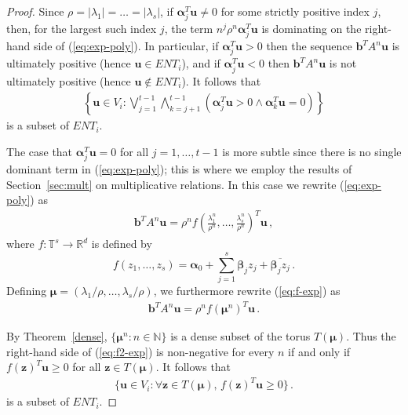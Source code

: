 \begin{proof}
Since $\rho=|\lambda_1|=\ldots=|\lambda_s|$, if
$\boldsymbol{\alpha}_j^T\boldsymbol{u}\neq 0$ for some strictly
positive index $j$, then, for the largest such index $j$, the term
$n^{j}\rho^n\boldsymbol{\alpha}_{j}^T\boldsymbol{u}$ is
dominating on the right-hand side of (\ref{eq:exp-poly}).  In
particular, if $\boldsymbol{\alpha}_{j}^T\boldsymbol{u}>0$ then the
sequence $\boldsymbol{b}^TA^n\boldsymbol{u}$ is ultimately positive
(hence $\boldsymbol{u}\in \mathit{ENT}_i$), and if
$\boldsymbol{\alpha}_{j}^T\boldsymbol{u}<0$ then
$\boldsymbol{b}^TA^n\boldsymbol{u}$ is not ultimately positive (hence
$\boldsymbol{u}\not\in\mathit{ENT}_i$).  It follows that
\begin{gather}
\left\{ \boldsymbol{u} \in V_i : \bigvee_{j=1}^{t-1}\bigwedge_{k=j+1}^{t-1}
(\boldsymbol{\alpha}_j^T \boldsymbol{u}>0 \wedge
\boldsymbol{\alpha}_k^T \boldsymbol{u}=0) \right\}
\label{eq:ENT1}
\end{gather}
is a subset of $\mathit{ENT}_i$.

The case that $\boldsymbol{\alpha}_j^T\boldsymbol{u}=0$ for all
$j=1,\ldots,t-1$ is more subtle since there is no single dominant term
in (\ref{eq:exp-poly}); this is where we employ the results of
Section~\ref{sec:mult} on multiplicative relations. In this case we
rewrite (\ref{eq:exp-poly}) as
\begin{gather}
\boldsymbol{b}^T A^n \boldsymbol{u} =
 \rho^n f\left(\frac{\lambda^n_1}{\rho^n},\ldots,
               \frac{\lambda^n_s}{\rho^n}\right)^T \boldsymbol{u} \, ,
\label{eq:f-exp}
\end{gather}
where $f:\mathbb{T}^s\rightarrow\mathbb{R}^d$ is defined by
\[f(z_1,\ldots,z_s)=\boldsymbol{\alpha}_0 + \sum_{j=1}^s \boldsymbol{\beta}_jz_j + \overline{\boldsymbol{\beta}_jz_j} \, .\]
Defining $\boldsymbol\mu=(\lambda_1/\rho,\ldots,\lambda_s/\rho)$, we furthermore rewrite (\ref{eq:f-exp}) as
\begin{gather}
\boldsymbol{b}^T A^n \boldsymbol{u} =
    \rho^n f(\boldsymbol\mu^n)^T \boldsymbol{u} \, .
\label{eq:f2-exp}
\end{gather}

By Theorem~\ref{dense}, $\{ \boldsymbol\mu^n : n \in
\mathbb{N} \}$ is a dense subset of the torus $T(\boldsymbol{\mu})$.
Thus the right-hand side of (\ref{eq:f2-exp}) is non-negative for
every $n$ if and only if $f(\boldsymbol{z})^T\boldsymbol{u}\geq 0$ for
all $\boldsymbol{z}\in T(\boldsymbol{\mu})$.  It follows that
\begin{gather} \big \{ \boldsymbol{u}\in V_i :
\forall \boldsymbol{z}\in T(\boldsymbol{\mu}),\,
                              f(\boldsymbol{z})^T\boldsymbol{u}\geq 0
\big\}\, .
\label{eq:ENT2}
\end{gather}
is a subset of $\mathit{ENT}_i$.


\end{proof}
